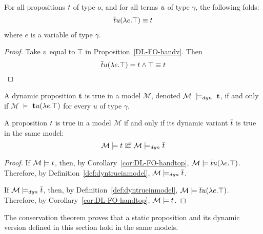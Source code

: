\begin{corollary} \label{cor:DL-FO-handtop} For all propositions $\t1$ of type $o$, and for all terms $\u1$ of type $\gamma$, the following folds: 
\begin{align}\tr{\t1} \u1 (\lambda e. \top) \logeq  \t1 \notag  %
\end{align}
where $e$ is a variable of type $\gamma$.
 \label{DL-FO-handtop}
\end{corollary}
\begin{proof} Take $\v1$ equal to $\top$ in Proposition~\ref{DL-FO-handv}. Then
$$\tr{\t1} \u1 (\lambda e. \top) = \t1 \land \top \logeq \t1$$
\end{proof}


\begin{definition} A dynamic proposition $\t2$ is true in a model $\mathcal{M}$, denoted
$\mathcal{M}~\models_{dyn}~\t2$, if and only if $\mathcal{M}$ $\models$ $\t2 u (\lambda e. \top)$ for every $u$ of type $\gamma$. \label{def:dyntrueinmodel}
\end{definition}

\begin{theorem}[Conservation] A proposition $\t1$ is true in a model $\mathcal{M}$  if and only if its dynamic variant $\tr{\t1}$ is true in the same model: 
 $$\mathcal{M} \models \t1 \ \text{iff} \ \mathcal{M} \models_{dyn} \tr{\t1}$$
 \label{th:conservation:FO}
\end{theorem}
\begin{proof}

If $\mathcal{M} \models \t1$, then, by Corollary~\ref{cor:DL-FO-handtop}, $\mathcal{M} \models \tr{\t1} \u1 (\lambda e.\top)$. Therefore, by Definition~\ref{def:dyntrueinmodel}, $\mathcal{M} \models_{dyn} \tr{\t1}$.

If $\mathcal{M} \models_{dyn} \tr{\t1}$, then, by Definition~\ref{def:dyntrueinmodel}, $\mathcal{M} \models \tr{\t1} \u1 (\lambda e.\top)$. Therefore, by Corollary~\ref{cor:DL-FO-handtop}, $\mathcal{M} \models \t1$.
\end{proof}

The conservation theorem proves that a static proposition and its dynamic version defined in this section hold in the same models.


